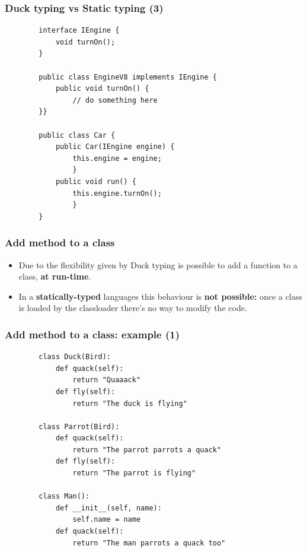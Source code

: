 \documentclass[xcolor ={table,usenames,dvipsnames}]{beamer}
\theoremstyle{definition}
\begin{document}
	\begin{frame}[fragile]
		\frametitle{Duck typing vs Static typing (3)}	
		\begin{lstlisting}
		interface IEngine {
			void turnOn();
		}
		
		public class EngineV8 implements IEngine {
			public void turnOn() {
				// do something here
		}}
		
		public class Car {
			public Car(IEngine engine) {
				this.engine = engine;
				}
			public void run() {
				this.engine.turnOn();
				}
		}
		\end{lstlisting}
	\end{frame}

		
		
		
	
	\begin{frame}[fragile]
		\frametitle{Add method to a class}
		\begin{itemize}
			\item Due to the flexibility given by Duck typing is possible to add a function to a class, \textbf{at run-time}.
			\item In a \textbf{statically-typed} languages this behaviour is \textbf{not possible: }once a class is loaded by the classloader there's no way to modify the code.
		\end{itemize}
	\end{frame}

	\begin{frame}[fragile]
		\frametitle{Add method to a class: example (1)}
		\begin{lstlisting}	
		class Duck(Bird):
			def quack(self):
				return "Quaaack"
			def fly(self):
				return "The duck is flying"
		
		class Parrot(Bird):
			def quack(self):
				return "The parrot parrots a quack"
			def fly(self):
				return "The parrot is flying"
				
		class Man():
			def __init__(self, name):
				self.name = name
			def quack(self):
				return "The man parrots a quack too"
		\end{lstlisting}
		
	\end{frame}
	
\end{document}

